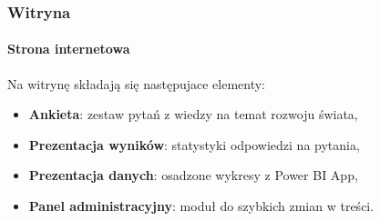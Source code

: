 \documentclass[10pt]{beamer}
\begin{document}
	






\begin{frame}
	\frametitle{Witryna}
	\framesubtitle{Strona internetowa}

	Na witrynę składają się następujace elementy:

	\bigskip	

	\begin{itemize}
		\item \textbf{Ankieta}: zestaw pytań z wiedzy na temat rozwoju świata,
		\item \textbf{Prezentacja wyników}: statystyki odpowiedzi na pytania,
		\item \textbf{Prezentacja danych}: osadzone wykresy z Power BI App,
		\item \textbf{Panel administracyjny}: moduł do szybkich zmian w treści.
	\end{itemize}
\end{frame}
\end{document}

